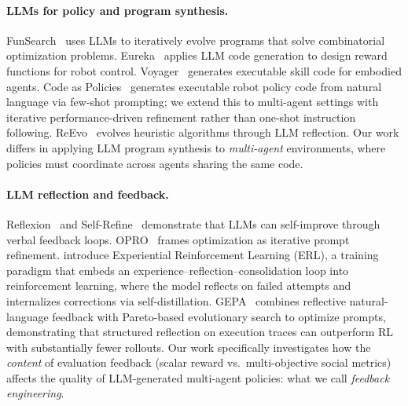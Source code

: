 \documentclass{nextgame2026} %
\begin{document}
\paragraph{LLMs for policy and program synthesis.}
FunSearch~\citep{romera2024mathematical} uses LLMs to iteratively evolve
programs that solve combinatorial optimization problems.
Eureka~\citep{ma2024eureka} applies LLM code generation to design reward
functions for robot control.  Voyager~\citep{wang2024voyager} generates
executable skill code for embodied agents. Code as Policies~\citep{code-as-policies} generates executable robot policy code from natural language via few-shot prompting; we extend this to multi-agent settings with iterative performance-driven refinement rather than one-shot instruction following.
ReEvo~\citep{ye2024reevo} evolves heuristic algorithms through LLM
reflection.  Our work differs in applying LLM program synthesis to
\emph{multi-agent} environments, where policies must coordinate across
agents sharing the same code.

\paragraph{LLM reflection and feedback.}
Reflexion~\citep{shinn2023reflexion} and
Self-Refine~\citep{madaan2023selfrefine} demonstrate that LLMs can
self-improve through verbal feedback loops.
OPRO~\citep{yang2024large} frames optimization as iterative prompt
refinement.  \citet{shi2026experiential} introduce Experiential Reinforcement Learning (ERL), a training paradigm that embeds an experience--reflection--consolidation loop into reinforcement learning, where the model reflects on failed attempts and internalizes corrections via self-distillation.
GEPA~\citep{gepa} combines reflective natural-language feedback with Pareto-based evolutionary search to optimize prompts, demonstrating that structured reflection on execution traces can outperform RL with substantially fewer rollouts.
Our work
specifically investigates how the \emph{content} of evaluation feedback
(scalar reward vs.\ multi-objective social metrics) affects the quality of
LLM-generated multi-agent policies: what we call \emph{feedback
engineering}.
\end{document}
